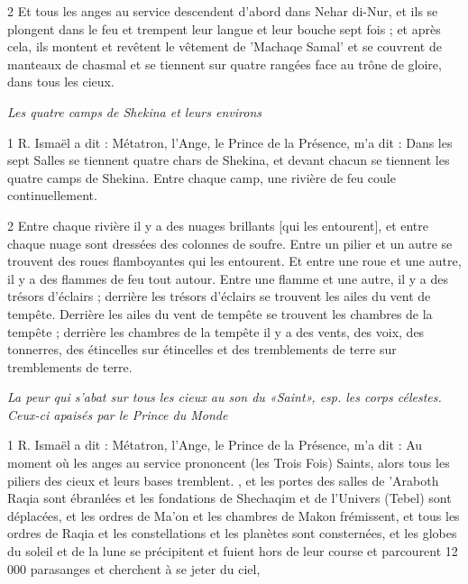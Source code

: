 \par 2 Et tous les anges au service descendent d'abord dans Nehar di-Nur, et ils se plongent dans le feu et trempent leur langue et leur bouche sept fois ; et après cela, ils montent et revêtent le vêtement de 'Machaqe Samal' et se couvrent de manteaux de chasmal et se tiennent sur quatre rangées face au trône de gloire, dans tous les cieux.



\par \textit{Les quatre camps de Shekina et leurs environs}

\par 1 R. Ismaël a dit : Métatron, l'Ange, le Prince de la Présence, m'a dit : Dans les sept Salles se tiennent quatre chars de Shekina, et devant chacun se tiennent les quatre camps de Shekina. Entre chaque camp, une rivière de feu coule continuellement.

\par 2 Entre chaque rivière il y a des nuages ​​brillants [qui les entourent], et entre chaque nuage sont dressées des colonnes de soufre. Entre un pilier et un autre se trouvent des roues flamboyantes qui les entourent. Et entre une roue et une autre, il y a des flammes de feu tout autour. Entre une flamme et une autre, il y a des trésors d'éclairs ; derrière les trésors d'éclairs se trouvent les ailes du vent de tempête. Derrière les ailes du vent de tempête se trouvent les chambres de la tempête ; derrière les chambres de la tempête il y a des vents, des voix, des tonnerres, des étincelles sur étincelles et des tremblements de terre sur tremblements de terre.



\par \textit{La peur qui s'abat sur tous les cieux au son du «Saint», esp. les corps célestes. Ceux-ci apaisés par le Prince du Monde}

\par 1 R. Ismaël a dit : Métatron, l'Ange, le Prince de la Présence, m'a dit : Au moment où les anges au service prononcent (les Trois Fois) Saints, alors tous les piliers des cieux et leurs bases tremblent. , et les portes des salles de 'Araboth Raqia sont ébranlées et les fondations de Shechaqim et de l'Univers (Tebel) sont déplacées, et les ordres de Ma'on et les chambres de Makon frémissent, et tous les ordres de Raqia et les constellations et les planètes sont consternées, et les globes du soleil et de la lune se précipitent et fuient hors de leur course et parcourent 12 000 parasanges et cherchent à se jeter du ciel,

